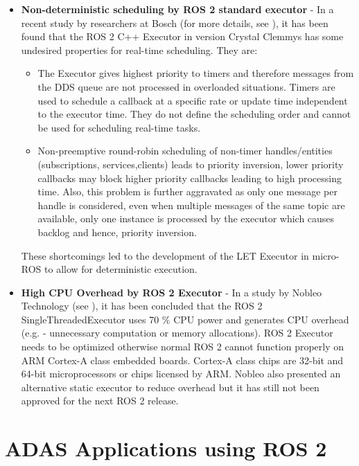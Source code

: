 \documentclass[%
xelatex,
	oneside,		%
	12pt,			%
	parskip=half,	%
	abstracton,
	chapterprefix=true%
    appendixprefix=true]
{scrbook}
\begin{document}
\begin{itemize}
\begin{center}
[Inverted Pendulum Setup]{Inverted Pendulum Setup \cite{deadline}}
\label{fig:inverpen}
\end{center}
\item {\bfseries Non-deterministic scheduling by ROS 2 standard executor} - In a recent study by researchers at Bosch (for more details, see \cite{ingo}), it has been found that the ROS 2 C++ Executor in version Crystal Clemmys has some undesired properties for real-time scheduling. They are:
\begin{itemize}
\item The Executor gives highest priority to timers and therefore messages from the DDS queue are not processed in overloaded situations. Timers are used to schedule a callback at a specific rate or update time independent to the executor time. They do not define the scheduling order and cannot be used for scheduling real-time tasks.
\item Non-preemptive round-robin scheduling of non-timer handles/entities (subscriptions, services,clients) leads to priority inversion, lower priority callbacks may block higher priority callbacks leading to high processing time. Also, this problem is further aggravated as only one message per handle is considered, even when multiple messages of the same topic are available, only one instance is processed by the executor which causes backlog and hence, priority inversion. 
\end{itemize} 
These shortcomings led to the development of the LET Executor in micro-ROS to allow for deterministic execution.
\item {\bfseries High CPU Overhead by ROS 2 Executor} - In a study by Nobleo Technology (see \cite{nobleo}), it has been concluded that the ROS 2 SingleThreadedExecutor uses 70 \% CPU power and generates CPU overhead (e.g. - unnecessary computation or memory allocations). ROS 2 Executor needs to be optimized otherwise normal ROS 2 cannot function properly on ARM Cortex-A class embedded boards. Cortex-A class chips are 32-bit and 64-bit microprocessors or chips licensed by ARM. Nobleo also presented an alternative static executor to reduce overhead but it has still not been approved for the next ROS 2 release.
\end{itemize}


	\chapter{ADAS Applications using ROS 2}
		
\end{document}
